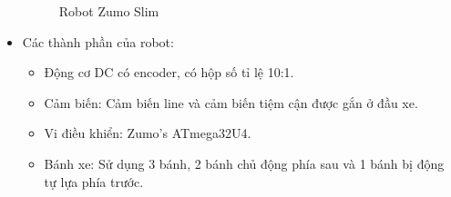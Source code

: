\begin{itemize}
\begin{figure}[H]
\begin{subfigure}{0.6\textwidth}
                \label{chap1_pic10b}
                \end{subfigure}
                \caption{Robot Zumo Slim}
                \label{chap1_pic10}
            \end{figure}
            \item Các thành phần của robot:
                \begin{itemize}[label=\textendash]
                    \item Động cơ DC có encoder, có hộp số tỉ lệ 10:1.
                    \item Cảm biến: Cảm biến line và cảm biến tiệm cận được gắn ở đầu xe.
                    \item Vi điều khiển: Zumo's ATmega32U4.
                    \item Bánh xe: Sử dụng 3 bánh, 2 bánh chủ động phía sau và 1 bánh bị động tự lựa phía trước.
                \end{itemize}
        \end{itemize}

